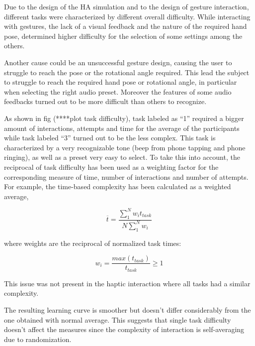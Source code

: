 \documentclass[journal]{./IEEEtran}
\begin{document}
Due to the design of the HA simulation and to the design of gesture interaction, different tasks were characterized by different overall difficulty. While interacting with gestures, the lack of a visual feedback and the nature of the required hand pose, determined higher difficulty for the selection of some settings among the others. 

Another cause could be an unsuccessful gesture design, causing the user to struggle to reach the pose or the rotational angle required. This lead the subject to struggle to reach the required hand pose or rotational angle, in particular when selecting the right audio preset. Moreover the features of some audio feedbacks turned out to be more difficult than others to recognize. 

As shown in fig (****plot task difficulty), task labeled as “1” required a bigger amount of interactions, attempts and time for the average of the participants while task labeled “3” turned out to be the less complex. This task is characterized by a very recognizable tone (beep from phone tapping and phone ringing), as well as a preset very easy to select.
To take this into account, the reciprocal of task difficulty has been used as a weighting factor for the corresponding measure of time, number of interactions and number of attempts. For example, the time-based complexity has been calculated as a weighted average,

\begin{equation}\label{eq:weighted_average}
	\overline{t} = \frac{ \sum_{1}^{N} w_i t_{task} } { N \sum_{1}^{N} w_i }
\end{equation}

where weights are the reciprocal of normalized task times:

\begin{equation}\label{eq:weighting_factor}
    w_i = \frac{ max(t_{task}) } { t_{task} } \ge 1
\end{equation}

This issue was not present in the haptic interaction where all tasks had a similar complexity.

The resulting learning curve is smoother but doesn’t differ considerably from the one obtained with normal average. This suggests that single task difficulty doesn’t affect the measures since the complexity of interaction is self-averaging due to randomization.
\end{document}
